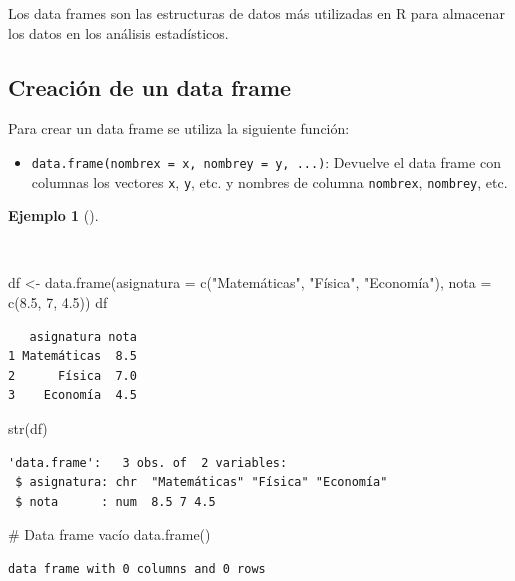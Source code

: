 \documentclass[
  a4paper,
]{scrreport}
\newenvironment{Shaded}{\begin{snugshade}}{\end{snugshade}}
\newcommand{\AttributeTok}[1]{\textcolor[rgb]{0.40,0.45,0.13}{#1}}
\newcommand{\CommentTok}[1]{\textcolor[rgb]{0.37,0.37,0.37}{#1}}
\newcommand{\DecValTok}[1]{\textcolor[rgb]{0.68,0.00,0.00}{#1}}
\newcommand{\FloatTok}[1]{\textcolor[rgb]{0.68,0.00,0.00}{#1}}
\newcommand{\FunctionTok}[1]{\textcolor[rgb]{0.28,0.35,0.67}{#1}}
\newcommand{\NormalTok}[1]{\textcolor[rgb]{0.00,0.23,0.31}{#1}}
\newcommand{\OtherTok}[1]{\textcolor[rgb]{0.00,0.23,0.31}{#1}}
\newcommand{\StringTok}[1]{\textcolor[rgb]{0.13,0.47,0.30}{#1}}
\providecommand{\tightlist}{%
  \setlength{\itemsep}{0pt}\setlength{\parskip}{0pt}}\usepackage{longtable,booktabs,array}
\theoremstyle{definition}
\theoremstyle{definition}
\newtheorem{example}{Ejemplo}[chapter]
\theoremstyle{remark}
\begin{document}
Los data frames son las estructuras de datos más utilizadas en R para
almacenar los datos en los análisis estadísticos.

\hypertarget{creaciuxf3n-de-un-data-frame}{%
\subsection{Creación de un data
frame}\label{creaciuxf3n-de-un-data-frame}}

Para crear un data frame se utiliza la siguiente función:

\begin{itemize}
\tightlist
\item
  \texttt{data.frame(nombrex\ =\ x,\ nombrey\ =\ y,\ ...)}: Devuelve el
  data frame con columnas los vectores \texttt{x}, \texttt{y}, etc. y
  nombres de columna \texttt{nombrex}, \texttt{nombrey}, etc.
\end{itemize}

\begin{example}[]\protect\hypertarget{exm-creacion-data-frames}{}\label{exm-creacion-data-frames}

~

\begin{Shaded}
\begin{Highlighting}[]
\NormalTok{df }\OtherTok{\textless{}{-}} \FunctionTok{data.frame}\NormalTok{(}\AttributeTok{asignatura =} \FunctionTok{c}\NormalTok{(}\StringTok{"Matemáticas"}\NormalTok{, }\StringTok{"Física"}\NormalTok{, }\StringTok{"Economía"}\NormalTok{), }\AttributeTok{nota =} \FunctionTok{c}\NormalTok{(}\FloatTok{8.5}\NormalTok{, }\DecValTok{7}\NormalTok{, }\FloatTok{4.5}\NormalTok{))}
\NormalTok{df}
\end{Highlighting}
\end{Shaded}

\begin{verbatim}
   asignatura nota
1 Matemáticas  8.5
2      Física  7.0
3    Economía  4.5
\end{verbatim}

\begin{Shaded}
\begin{Highlighting}[]
\FunctionTok{str}\NormalTok{(df)}
\end{Highlighting}
\end{Shaded}

\begin{verbatim}
'data.frame':   3 obs. of  2 variables:
 $ asignatura: chr  "Matemáticas" "Física" "Economía"
 $ nota      : num  8.5 7 4.5
\end{verbatim}

\begin{Shaded}
\begin{Highlighting}[]
\CommentTok{\# Data frame vacío}
\FunctionTok{data.frame}\NormalTok{()}
\end{Highlighting}
\end{Shaded}

\begin{verbatim}
data frame with 0 columns and 0 rows
\end{verbatim}

\end{example}
\end{document}
